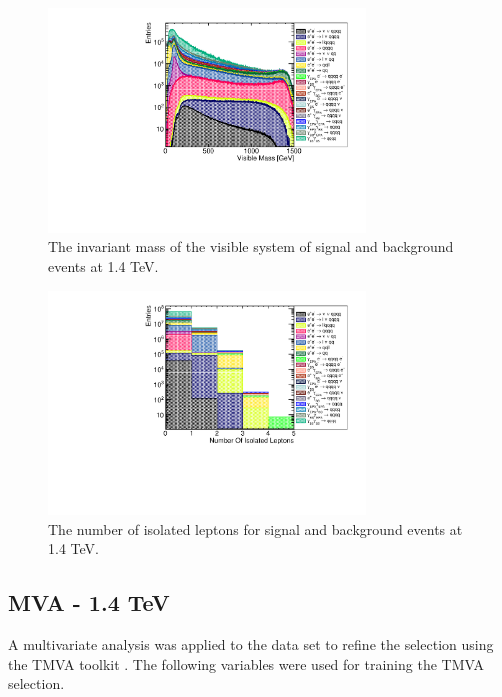 \begin{figure}
\centering
\includegraphics[width=0.75\textwidth]{PhysicsAnalysis/Plots/PreSelection/1400GeV/InvariantMassSystem.pdf}
\caption[Invariant mass of the visible system at 1.4 TeV.]{The invariant mass of the visible system of signal and background events at 1.4 TeV.}
\label{fig:preselection2}
\end{figure}

\begin{figure}
\centering
\includegraphics[width=0.75\textwidth]{PhysicsAnalysis/Plots/PreSelection/1400GeV/NumberOfIsolatedLeptons.pdf}
\caption[Number of isolated leptons at 1.4 TeV.]{The number of isolated leptons for signal and background events at 1.4 TeV.}
\label{fig:preselection3}
\end{figure}

\subsection{MVA - 1.4 TeV}
A multivariate analysis was applied to the data set to refine the selection using the TMVA toolkit \cite{Hocker:2007ht}. The following variables were used for training the TMVA selection.  

